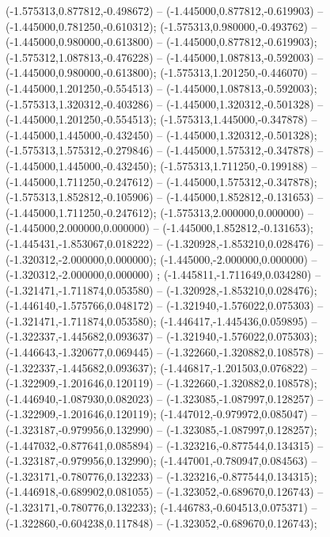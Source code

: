  (-1.575313,0.877812,-0.498672) -- (-1.445000,0.877812,-0.619903) -- (-1.445000,0.781250,-0.610312);
 (-1.575313,0.980000,-0.493762) -- (-1.445000,0.980000,-0.613800) -- (-1.445000,0.877812,-0.619903);
 (-1.575312,1.087813,-0.476228) -- (-1.445000,1.087813,-0.592003) -- (-1.445000,0.980000,-0.613800);
 (-1.575313,1.201250,-0.446070) -- (-1.445000,1.201250,-0.554513) -- (-1.445000,1.087813,-0.592003);
 (-1.575313,1.320312,-0.403286) -- (-1.445000,1.320312,-0.501328) -- (-1.445000,1.201250,-0.554513);
 (-1.575313,1.445000,-0.347878) -- (-1.445000,1.445000,-0.432450) -- (-1.445000,1.320312,-0.501328);
 (-1.575313,1.575312,-0.279846) -- (-1.445000,1.575312,-0.347878) -- (-1.445000,1.445000,-0.432450);
 (-1.575313,1.711250,-0.199188) -- (-1.445000,1.711250,-0.247612) -- (-1.445000,1.575312,-0.347878);
 (-1.575313,1.852812,-0.105906) -- (-1.445000,1.852812,-0.131653) -- (-1.445000,1.711250,-0.247612);
 (-1.575313,2.000000,0.000000) -- (-1.445000,2.000000,0.000000) -- (-1.445000,1.852812,-0.131653);
 (-1.445431,-1.853067,0.018222) -- (-1.320928,-1.853210,0.028476) -- (-1.320312,-2.000000,0.000000);
 (-1.445000,-2.000000,0.000000) -- (-1.320312,-2.000000,0.000000) ;
 (-1.445811,-1.711649,0.034280) -- (-1.321471,-1.711874,0.053580) -- (-1.320928,-1.853210,0.028476);
 (-1.446140,-1.575766,0.048172) -- (-1.321940,-1.576022,0.075303) -- (-1.321471,-1.711874,0.053580);
 (-1.446417,-1.445436,0.059895) -- (-1.322337,-1.445682,0.093637) -- (-1.321940,-1.576022,0.075303);
 (-1.446643,-1.320677,0.069445) -- (-1.322660,-1.320882,0.108578) -- (-1.322337,-1.445682,0.093637);
 (-1.446817,-1.201503,0.076822) -- (-1.322909,-1.201646,0.120119) -- (-1.322660,-1.320882,0.108578);
 (-1.446940,-1.087930,0.082023) -- (-1.323085,-1.087997,0.128257) -- (-1.322909,-1.201646,0.120119);
 (-1.447012,-0.979972,0.085047) -- (-1.323187,-0.979956,0.132990) -- (-1.323085,-1.087997,0.128257);
 (-1.447032,-0.877641,0.085894) -- (-1.323216,-0.877544,0.134315) -- (-1.323187,-0.979956,0.132990);
 (-1.447001,-0.780947,0.084563) -- (-1.323171,-0.780776,0.132233) -- (-1.323216,-0.877544,0.134315);
 (-1.446918,-0.689902,0.081055) -- (-1.323052,-0.689670,0.126743) -- (-1.323171,-0.780776,0.132233);
 (-1.446783,-0.604513,0.075371) -- (-1.322860,-0.604238,0.117848) -- (-1.323052,-0.689670,0.126743);
